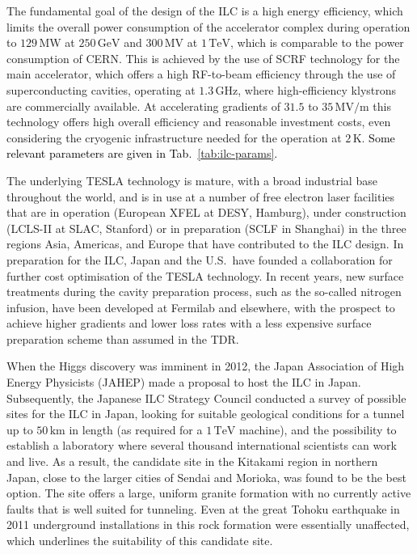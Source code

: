 \documentclass[%
 reprint,
 amsmath,amssymb,
 aps,
]{revtex4-1}
\newcommand{\juan}[1]{\textcolor{black}{{#1}}}
\def\Tab#1{Tab.~\ref{#1}}
\begin{document}
The fundamental goal of the design of the ILC is a high energy efficiency, which limits the overall power consumption of the accelerator complex during operation to $129\,{\mathrm{MW}}$ at  $250\,{\mathrm{GeV}}$ and $300\,{\mathrm{MV}}$ at  $1\,{\mathrm{TeV}}$, which is comparable to the power consumption of CERN.
This is achieved by the use of SCRF technology for the main accelerator, which offers a high RF-to-beam efficiency through the use of superconducting cavities, operating at $1.3\,{\mathrm{GHz}}$, where high-efficiency klystrons are commercially available.
At accelerating gradients of $31.5$ to $35\,{\mathrm{MV/m}}$ this technology offers high overall efficiency and reasonable investment costs, even considering the cryogenic infrastructure needed for the operation at $2\,{\mathrm{K}}$. \juan{Some relevant parameters are given in \Tab{tab:ilc-params}.}

The underlying TESLA technology is mature, with a broad industrial base throughout the world, and is in use at a number of free electron laser facilities that are in operation (European XFEL at DESY, Hamburg), under construction (LCLS-II at SLAC, Stanford) or in preparation (SCLF in Shanghai) in the three regions Asia, Americas, and Europe that have contributed to the ILC design. In preparation for the ILC, Japan and the U.S.\ have founded a collaboration for further cost optimisation of the TESLA technology.
In recent years, new surface treatments during the cavity preparation process, such as the so-called nitrogen infusion, have been developed at Fermilab and elsewhere, with the prospect to achieve higher gradients and lower loss rates with a less expensive surface preparation scheme than assumed in the TDR.

When the Higgs discovery was imminent in 2012, the Japan Association of High Energy Physicists (JAHEP) made a proposal to host the ILC in Japan. 
Subsequently, the Japanese ILC Strategy Council conducted a survey of possible sites for the ILC in Japan, looking for  suitable geological conditions for a tunnel up to $50\,{\mathrm{km}}$ in length (as required for a $1\,{\mathrm{TeV}}$  machine), and the possibility to establish a laboratory where several thousand international scientists can work and live. 
As a result, the candidate site in the Kitakami region in northern Japan, close to the larger cities of Sendai and Morioka, was found to be the best option. 
The site offers a large, uniform granite formation with no currently active faults that is well suited for tunneling.
Even at the great Tohoku earthquake in 2011 underground installations in this rock formation were essentially unaffected, which underlines the suitability of this candidate site. 
\end{document}
